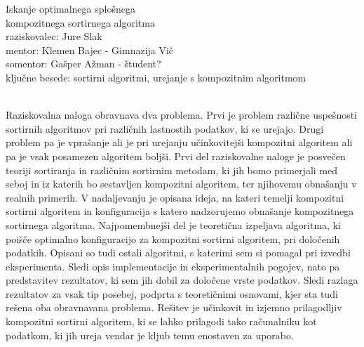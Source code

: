 \documentclass[a4paper,oneside,12pt]{article}
\begin{document}
\begin{center}
  {\huge Iskanje optimalnega splošnega \\ kompozitnega sortirnega algoritma} \\[10mm]
 raziskovalec: Jure Slak \\[5mm]
 mentor: Klemen Bajec - Gimnazija Vič \\[3mm]
 somentor: Gašper Ažman - študent?  \\[5mm]
 ključne besede:  sortirni algoritmi, urejanje s kompozitnim algoritmom\\[10mm]
\end{center} 

 { \\[4mm]}
Raziskovalna naloga obravnava dva problema. Prvi je problem različne uspešnosti 
sortirnih algoritmov pri različnih lastnostih podatkov, ki se urejajo. Drugi problem pa je
vprašanje ali je pri urejanju učinkovitejši kompozitni algoritem ali pa je vsak posamezen
algoritem boljši. Prvi del raziskovalne naloge je posvečen teoriji sortiranja in različnim sortirnim
metodam, ki jih bomo primerjali med seboj in iz katerih bo sestavljen kompozitni
algoritem, ter njihovemu obnašanju v realnih primerih. V nadaljevanju je opisana ideja, na
kateri temelji kompozitni sortirni algoritem in konfiguracija s katero nadzorujemo
obnašanje kompozitnega sortirnega algoritma. Najpomembnejši del je teoretična izpeljava
algoritma, ki poišče optimalno konfiguracijo za kompozitni sortirni algoritem, pri
določenih podatkih. Opisani so tudi ostali algoritmi, s katerimi sem si pomagal pri
izvedbi eksperimenta. Sledi opis implementacije in eksperimentalnih pogojev, nato pa
predstavitev rezultatov, ki sem jih dobil za določene vrste podatkov.
Sledi razlaga rezultatov za vsak tip posebej, podprta s teoretičnimi osnovami, kjer sta
tudi rešena oba obravnavana problema. Rešitev je učinkovit in izjemno prilagodljiv
kompozitni sortirni algoritem, ki se lahko prilagodi tako računalniku kot podatkom, ki jih
ureja vendar je kljub temu enostaven za uporabo.

\pagebreak
\mbox{}

\pagebreak
\mbox{}
\end{document}
